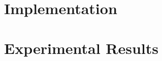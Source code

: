 \documentclass[12pt,twoside]{report}
\begin{document}
\chapter{Implementation}



\chapter{Experimental Results}




{}
%
\newpage
{} 
%


\end{document}
